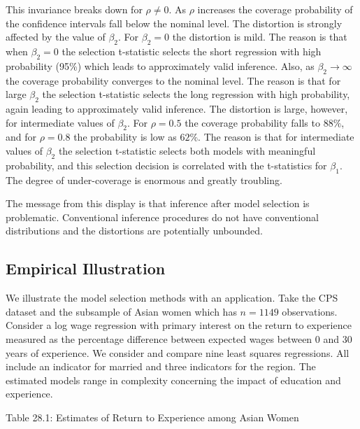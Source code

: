 \documentclass[10pt]{article}
\begin{document}
This invariance breaks down for $\rho \neq 0$. As $\rho$ increases the coverage probability of the confidence intervals fall below the nominal level. The distortion is strongly affected by the value of $\beta_{2}$. For $\beta_{2}=0$ the distortion is mild. The reason is that when $\beta_{2}=0$ the selection t-statistic selects the short regression with high probability (95\%) which leads to approximately valid inference. Also, as $\beta_{2} \rightarrow \infty$ the coverage probability converges to the nominal level. The reason is that for large $\beta_{2}$ the selection t-statistic selects the long regression with high probability, again leading to approximately valid inference. The distortion is large, however, for intermediate values of $\beta_{2}$. For $\rho=0.5$ the coverage probability falls to $88 \%$, and for $\rho=0.8$ the probability is low as $62 \%$. The reason is that for intermediate values of $\beta_{2}$ the selection $\mathrm{t}$-statistic selects both models with meaningful probability, and this selection decision is correlated with the t-statistics for $\beta_{1}$. The degree of under-coverage is enormous and greatly troubling.

The message from this display is that inference after model selection is problematic. Conventional inference procedures do not have conventional distributions and the distortions are potentially unbounded.

\subsection{Empirical Illustration}
We illustrate the model selection methods with an application. Take the CPS dataset and the subsample of Asian women which has $n=1149$ observations. Consider a log wage regression with primary interest on the return to experience measured as the percentage difference between expected wages between 0 and 30 years of experience. We consider and compare nine least squares regressions. All include an indicator for married and three indicators for the region. The estimated models range in complexity concerning the impact of education and experience.

Table 28.1: Estimates of Return to Experience among Asian Women
\end{document}

